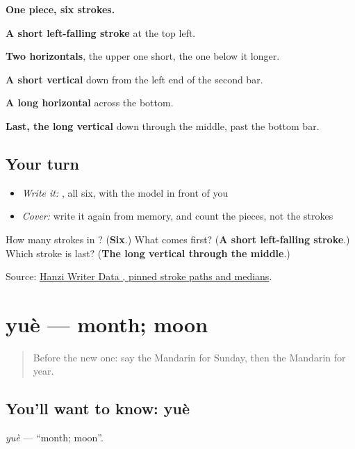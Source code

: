 \begin{quote}
\end{quote}

\textbf{One piece, six strokes.}

\textbf{A short left-falling stroke} at the top left.

\textbf{Two horizontals}, the upper one short, the one below it longer.

\textbf{A short vertical} down from the left end of the second bar.

\textbf{A long horizontal} across the bottom.

\textbf{Last, the long vertical} down through the middle, past the bottom bar.

\subsection*{Your turn}
\begin{itemize}
\raggedright
  \item \emph{Write it:} , all six, with the model in front of you
  \item \emph{Cover:} write it again from memory, and count the pieces, not the strokes
\end{itemize}

\begin{tcolorbox}[breakable,colback=teal!4,colframe=teal!35!black,title={Before you move on}]
How many strokes in ? (\textbf{Six}.) What comes first? (\textbf{A short left-falling stroke}.) Which stroke is last? (\textbf{The long vertical through the middle}.)

Source: \href{https://raw.githubusercontent.com/chanind/hanzi-writer-data/68d10a4b21150cae5e1ebbd223eed289cf32d90c/data/\%E5\%B9\%B4.json}{Hanzi Writer Data , pinned stroke paths and medians}.
\end{tcolorbox}
\section[yuè]{yuè — month; moon}

\label{lesson:ZH-C47-yue}



\begin{quote}
Before the new one: say the Mandarin for Sunday, then the Mandarin for year.
\end{quote}

\subsection*{You'll want to know: yuè}
\emph{yuè} — \textquotedblleft{}month; moon\textquotedblright{}.

